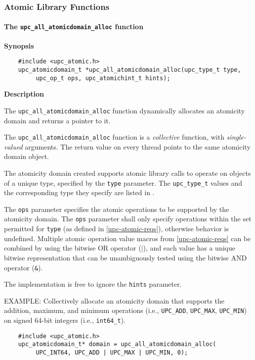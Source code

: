 \newpage
\subsubsection{Atomic Library Functions}
\label{upc-atomic-functions}

\paragraph{The {\tt upc\_all\_atomicdomain\_alloc} function}

{\bf Synopsis}

\npf\vspace{-1.8em}
\begin{verbatim}
    #include <upc_atomic.h>
    upc_atomicdomain_t *upc_all_atomicdomain_alloc(upc_type_t type,
         upc_op_t ops, upc_atomichint_t hints);
\end{verbatim}

{\bf Description}

\np The {\tt upc\_all\_atomicdomain\_alloc} function dynamically allocates an
    atomicity domain and returns a pointer to it.

\np The {\tt upc\_all\_atomicdomain\_alloc} function is a {\em collective} function,
    with {\em single-valued} arguments.
    The return value on every thread points to the same atomicity domain
    object.

\np The atomicity domain created supports atomic library calls to operate on objects of a
    unique type, specified by the {\tt type} parameter.  The {\tt upc\_type\_t}
    values and the corresponding type they specify are listed in
    \upctypesection{}.

\np The {\tt ops} parameter specifies the atomic operations to be supported by
    the atomicity domain.  The {\tt ops} parameter shall only specify
    operations within the set permitted for {\tt type} (as defined in
    \ref{upc-atomic-reqs}), otherwise behavior is undefined.
    Multiple atomic operation value macros from \ref{upc-atomic-reqs}
    can be combined by using the bitwise OR operator ($|$), and each value has
    a unique bitwise representation that can be unambiguously tested using the
    bitwise AND operator ({\tt \&}).

\np The implementation is free to ignore the {\tt hints} parameter.

\np EXAMPLE: Collectively allocate an atomicity domain that supports the
    addition, maximum, and minimum operations (i.e., {\tt UPC\_ADD},
    {\tt UPC\_MAX}, {\tt UPC\_MIN}) on signed 64-bit integers (i.e.,
    {\tt int64\_t}).
\begin{verbatim}
    #include <upc_atomic.h>
    upc_atomicdomain_t* domain = upc_all_atomicdomain_alloc(
         UPC_INT64, UPC_ADD | UPC_MAX | UPC_MIN, 0);
\end{verbatim}
\vfill

